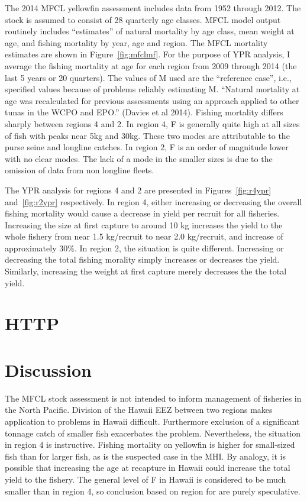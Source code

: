 \documentclass[12pt,letterpaper]{article}
\newcommand\help[1]{\color{Magenta}{\it #1 }\normalcolor}
\begin{document}
The 2014 MFCL yellowfin assessment includes data from 1952 through
2012. The stock is assumed to consist of 28 quarterly age classes. 
MFCL model output routinely includes ``estimates'' of natural mortality by age
class, mean weight at age, and fishing mortality by year, age and
region. 
The MFCL mortality estimates are shown in Figure~\ref{fig:mfclmf}. 
For the purpose of YPR analysis, I average the fishing
mortality at age for each region from 2009 through 2014 (the last 5
years or 20 quarters). 
The values of M used are the ``reference case'', i.e., 
specified values because of problems reliably estimating M. 
``Natural mortality at age was recalculated for previous assessments
using an approach applied to other tunas in the WCPO and EPO.'' (Davies
et al 2014).
Fishing mortality differs sharply between regions 4 and 2. In region
4, F is generally quite high at all sizes of fish with peaks near 5kg
and 30kg. These two modes are attributable to the purse seine and
longline catches.
In region 2, F is an order of magnitude lower with no clear
modes. The lack of a mode in the smaller sizes is due to the omission
of data from non longline fleets.


The YPR analysis for regions 4 and 2 are
presented in Figures~\ref{fig:r4ypr} and~\ref{fig:r2ypr} respectively.
In region 4, either increasing or decreasing the overall fishing
mortality would cause a decrease in yield per recruit for all
fisheries.
Increasing the size at first capture to around 10 kg increases the
yield to the whole fishery from near 1.5 kg/recruit to near 2.0
kg/recruit, and increase of approximately 30\%.
In region 2, the situation is quite different. 
Increasing or decreasing the total fishing morality simply increases
or decreases the yield.
Similarly, increasing the weight at first capture merely decreases the
the total yield.

\section*{HTTP}\help{Working on it.}

\section*{Discussion}
The MFCL stock assessment is not intended to inform management of fisheries in
the North Pacific. Division of the Hawaii EEZ between two regions
makes application to problems in Hawaii difficult. Furthermore
exclusion of a significant tonnage catch of smaller fish exacerbates
the problem. Nevertheless, the situation in region 4 is instructive.
Fishing mortality on yellowfin is higher for small-sized fish than for
larger fish, as is the suspected case in the MHI. By analogy, it is
possible that increasing the age at recapture in Hawaii could increase
the total yield to the fishery. The general level of F in Hawaii is
considered to be much smaller than in region 4, so conclusion based on
region for are purely speculative.
\end{document}
